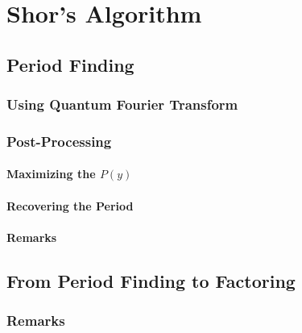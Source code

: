     \section{Shor's Algorithm} %

        \subsection{Period Finding} %

            \subsubsection{Using Quantum Fourier Transform} %

            \subsubsection{Post-Processing} %

                \paragraph{Maximizing the \(P(y)\)} %

                \paragraph{Recovering the Period} %

                \paragraph{Remarks} %

        \subsection{From Period Finding to Factoring} %

            \subsubsection{Remarks} %

